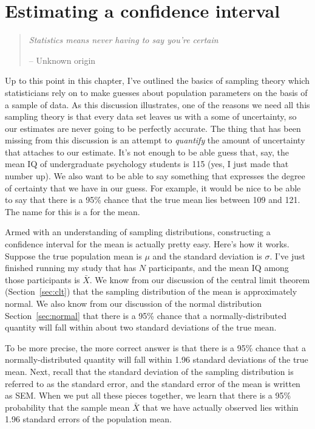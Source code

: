 \section{Estimating a confidence interval\label{sec:ci}}

\begin{quote}
{\it Statistics means never having to say you're certain}

\hspace*{2cm} -- Unknown origin
\end{quote}

\noindent
Up to this point in this chapter, I've outlined the basics of sampling theory which statisticians rely on to make guesses about population parameters on the basis of a sample of data. As this discussion illustrates, one of the reasons we need all this sampling theory is that every data set leaves us with a some of uncertainty, so our estimates are never going to be perfectly accurate. The thing that has been missing from this discussion is an attempt to {\it quantify} the amount of uncertainty that attaches to our estimate. It's not enough to be able guess that, say, the mean IQ of undergraduate psychology students is 115 (yes, I just made that number up). We also want to be able to say something that expresses the degree of certainty that we have in our guess. For example, it would be nice to be able to say that there is a 95\% chance that the true mean lies between 109 and 121. The name for this is a  for the mean.

Armed with an understanding of sampling distributions, constructing a confidence interval for the mean is actually pretty easy. Here's how it works. Suppose the true population mean is $\mu$ and the standard deviation is $\sigma$. I've just finished running my study that has $N$ participants, and the mean IQ among those participants is $\bar{X}$. We know from our discussion of the central limit theorem (Section~\ref{sec:clt}) that the sampling distribution of the mean is approximately normal. We also know from our discussion of the normal distribution Section~\ref{sec:normal} that there is a 95\% chance that a normally-distributed quantity will fall within about two standard deviations of the true mean. 

To be more precise, the more correct answer is that there is a 95\% chance that a normally-distributed quantity will fall within 1.96 standard deviations of the true mean. Next, recall that the standard deviation of the sampling distribution is referred to as the standard error, and the standard error of the mean is written as SEM. When we put all these pieces together, we learn that there is a 95\% probability that the sample mean $\bar{X}$ that we have actually observed lies within 1.96 standard errors of the population mean. 

